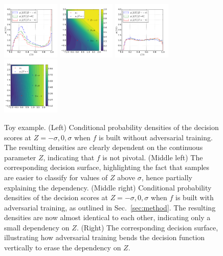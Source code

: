 \documentclass[twocolumn,superscriptaddress,aps]{revtex4-1}
\theoremstyle{plain}
\begin{document}
\begin{figure}
    \begin{center}
        \includegraphics[width=0.245\textwidth]{figures/f-plain.pdf}
        \includegraphics[width=0.245\textwidth]{figures/surface-plain.pdf}
        \includegraphics[width=0.245\textwidth]{figures/f-adversary.pdf}
        \includegraphics[width=0.245\textwidth]{figures/surface-adversary.pdf}
    \end{center}
    \vspace{-0.5cm}
    \caption{Toy example.
    (Left) Conditional probability densities of the decision scores at $Z=-\sigma, 0, \sigma$
       when $f$ is built without adversarial training. The resulting densities
       are clearly dependent on the continuous parameter $Z$, indicating that $f$ is not pivotal.
    (Middle left) The corresponding decision surface, highlighting
       the fact that samples are easier to classify for values of $Z$ above $\sigma$,
       hence partially explaining the dependency.
    (Middle right) Conditional probability densities of the decision scores at $Z=-\sigma, 0, \sigma$ when $f$ is
       built with adversarial training, as outlined in Sec.~\ref{sec:method}.
       The resulting densities are now almost identical to each other, indicating only a
       small dependency on $Z$.
    (Right) The corresponding decision surface, illustrating how adversarial
       training bends the decision function vertically to erase the dependency on $Z$.
    }
    \label{fig:toy}
\end{figure}
\end{document}
